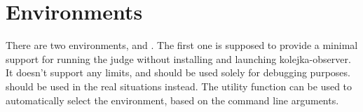 \section{Environments}\label{sec:environments}

    There are two environments, \hyperref[sec:LocalComputer]{} and
    \hyperref[sec:KolejkaObserver]{}.
    The first one is supposed to provide a minimal support for running the judge without installing and launching
    kolejka-observer.
    It doesn't support any limits, and should be used solely for debugging purposes.
    \hyperref[sec:KolejkaObserver]{} should be used in the real situations instead.
    The utility function \hyperref[sec:detect_environment]{} can be used to
    automatically select the environment,
    based on the command line arguments.

\section*{}

\renewcommand\labelitemiii{\textbullet}

